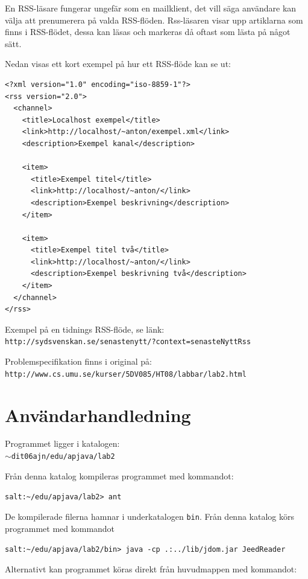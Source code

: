 \documentclass[titlepage, twoside, a4paper, 12pt]{article}
\def\pathtocode{$\sim$dit06ajn/edu/apjava/lab2}
\begin{document}
En RSS-läsare fungerar ungefär som en mailklient, det vill säga
användare kan välja att prenumerera på valda RSS-flöden. Rss-läsaren
visar upp artiklarna som finns i RSS-flödet, dessa kan läsas och
markeras då oftast som lästa på något sätt.

Nedan visas ett kort exempel på hur ett RSS-flöde kan se ut:
\begin{footnotesize}
\begin{verbatim}
<?xml version="1.0" encoding="iso-8859-1"?>
<rss version="2.0">
  <channel>
    <title>Localhost exempel</title>
    <link>http://localhost/~anton/exempel.xml</link>
    <description>Exempel kanal</description>

    <item>
      <title>Exempel titel</title>
      <link>http://localhost/~anton/</link>
      <description>Exempel beskrivning</description>
    </item>

    <item>
      <title>Exempel titel två</title>
      <link>http://localhost/~anton/</link>
      <description>Exempel beskrivning två</description>
    </item>
  </channel>
</rss>
\end{verbatim}
\end{footnotesize}

Exempel på en tidnings RSS-flöde, se länk:\\
\verb!http://sydsvenskan.se/senastenytt/?context=senasteNyttRss!

Problemspecifikation finns i original på:\\
\verb!http://www.cs.umu.se/kurser/5DV085/HT08/labbar/lab2.html!

\section{Användarhandledning}\label{Anvandarhandledning}
Programmet ligger i katalogen:\\
\texttt{\pathtocode}

Från denna katalog kompileras programmet med kommandot:

\verb!salt:~/edu/apjava/lab2> ant!

De kompilerade filerna hamnar i underkatalogen \verb!bin!. Från denna
katalog körs programmet med kommandot

\verb!salt:~/edu/apjava/lab2/bin> java -cp .:../lib/jdom.jar JeedReader!

Alternativt kan programmet köras direkt från huvudmappen med
kommandot:
\end{document}
